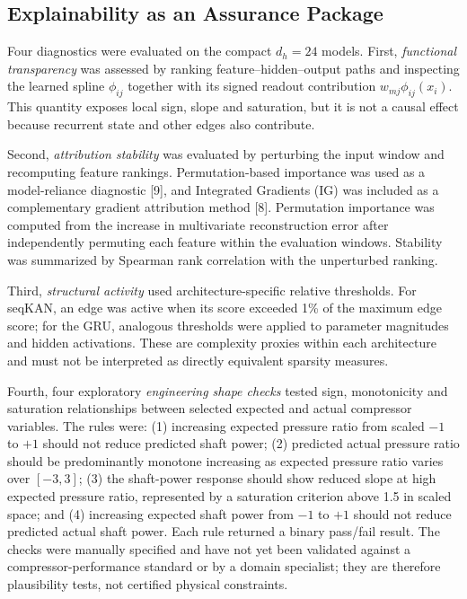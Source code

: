 \documentclass[conference]{IEEEtran}
\begin{document}
\subsection{Explainability as an Assurance Package}
Four diagnostics were evaluated on the compact $d_h=24$ models. First, \emph{functional transparency} was assessed by ranking feature--hidden--output paths and inspecting the learned spline $\phi_{ij}$ together with its signed readout contribution $w_{mj}\phi_{ij}(x_i)$. This quantity exposes local sign, slope and saturation, but it is not a causal effect because recurrent state and other edges also contribute.

Second, \emph{attribution stability} 
was evaluated by perturbing the input window and recomputing feature rankings. Permutation-based importance was used as a model-reliance diagnostic [9], and Integrated Gradients (IG) was included as a complementary gradient attribution method [8]. Permutation importance was computed from the increase in multivariate reconstruction error after independently permuting each feature within the evaluation windows. Stability was summarized by Spearman rank correlation with the unperturbed ranking.

Third, \emph{structural activity} used architecture-specific relative thresholds. For seqKAN, an edge was active when its score exceeded 1\% of the maximum edge score; for the GRU, analogous thresholds were applied to parameter magnitudes and hidden activations. These are complexity proxies within each architecture and must not be interpreted as directly equivalent sparsity measures.

Fourth, four exploratory \emph{engineering shape checks} tested sign, monotonicity and saturation relationships between selected expected and actual compressor variables. The rules were: (1) increasing expected pressure ratio from scaled $-1$ to $+1$ should not reduce predicted shaft power; (2) predicted actual pressure ratio should be predominantly monotone increasing as expected pressure ratio varies over $[-3,3]$; (3) the shaft-power response should show reduced slope at high expected pressure ratio, represented by a saturation criterion above 1.5 in scaled space; and (4) increasing expected shaft power from $-1$ to $+1$ should not reduce predicted actual shaft power. Each rule returned a binary pass/fail result. The checks were manually specified and have not yet been validated against a compressor-performance standard or by a domain specialist; they are therefore plausibility tests, not certified physical constraints.
\end{document}

